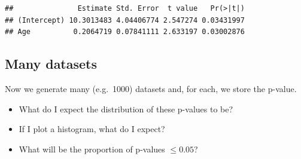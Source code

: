 \documentclass[]{article}
\newenvironment{Shaded}{\begin{snugshade}}{\end{snugshade}}
\newcommand{\KeywordTok}[1]{\textcolor[rgb]{0.13,0.29,0.53}{\textbf{#1}}}
\newcommand{\DataTypeTok}[1]{\textcolor[rgb]{0.13,0.29,0.53}{#1}}
\newcommand{\DecValTok}[1]{\textcolor[rgb]{0.00,0.00,0.81}{#1}}
\newcommand{\CommentTok}[1]{\textcolor[rgb]{0.56,0.35,0.01}{\textit{#1}}}
\newcommand{\OperatorTok}[1]{\textcolor[rgb]{0.81,0.36,0.00}{\textbf{#1}}}
\newcommand{\NormalTok}[1]{#1}
\providecommand{\tightlist}{%
  \setlength{\itemsep}{0pt}\setlength{\parskip}{0pt}}
\begin{document}
\begin{Shaded}
\end{Shaded}

\begin{verbatim}
##               Estimate Std. Error  t value   Pr(>|t|)
## (Intercept) 10.3013483 4.04406774 2.547274 0.03431997
## Age          0.2064719 0.07841111 2.633197 0.03002876
\end{verbatim}

\subsection{Many datasets}\label{many-datasets-1}

Now we generate many (e.g.~1000) datasets and, for each, we store the
p-value.

\begin{Shaded}
\end{Shaded}

\begin{itemize}
\tightlist
\item
  What do I expect the distribution of these p-values to be?
\item
  If I plot a histogram, what do I expect?
\item
  What will be the proportion of p-values \(\leq 0.05\)?
\end{itemize}
\end{document}
